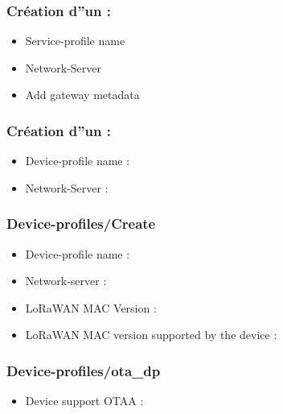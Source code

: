 \documentclass[letterpaper,10pt,french]{sphinxmanual}
\begin{document}
\subsubsection{Création d”un  :}
\label{\detokenize{AnnexeA:creation-d-un-service-profile}}\begin{itemize}
\item {} 
Service-profile name 

\item {} 
Network-Server 

\item {} 
Add gateway metadata 

\end{itemize}


\subsubsection{Création d”un  :}
\label{\detokenize{AnnexeA:creation-d-un-device-profile}}\begin{itemize}
\item {} 
Device-profile name : 

\item {} 
Network-Server : 

\end{itemize}


\subsubsection{Device-profiles/Create}
\label{\detokenize{AnnexeA:device-profiles-create}}\begin{itemize}
\item {} 
Device-profile name : 

\item {} 
Network-server : 

\item {} 
LoRaWAN MAC Version : 

\item {} 
LoRaWAN MAC version supported by the device : 

\end{itemize}


\subsubsection{Device-profiles/ota\_dp}
\label{\detokenize{AnnexeA:device-profiles-ota-dp}}\begin{itemize}
\item {} 
Device support OTAA : 

\end{itemize}
\end{document}
